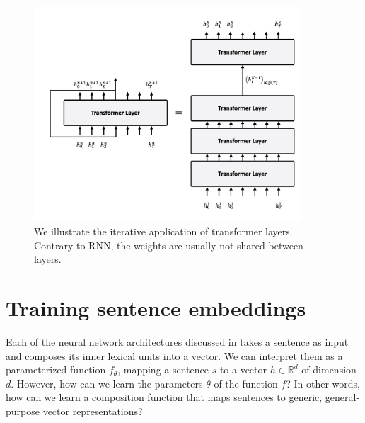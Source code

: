 
\begin{figure}[!ht]
	\includegraphics[width=10cm]{images/transformer_layer_unfold.png}
	\caption[RNN cell unfold]{We illustrate the iterative application of transformer layers. Contrary to RNN, the weights are usually not shared between layers.}
\end{figure}

\section{Training sentence embeddings}



Each of the neural network architectures discussed in  takes a sentence as input and composes its inner lexical units into a vector. We can interpret them as a parameterized function $f_{\theta}$, mapping a sentence $s$ to a vector $h \in \mathbb{R}^{d}$ of dimension $d$. However, how can we learn the parameters $\theta$ of the function $f$? In other words, how can we learn a composition function that maps sentences to generic, general-purpose vector representations?

